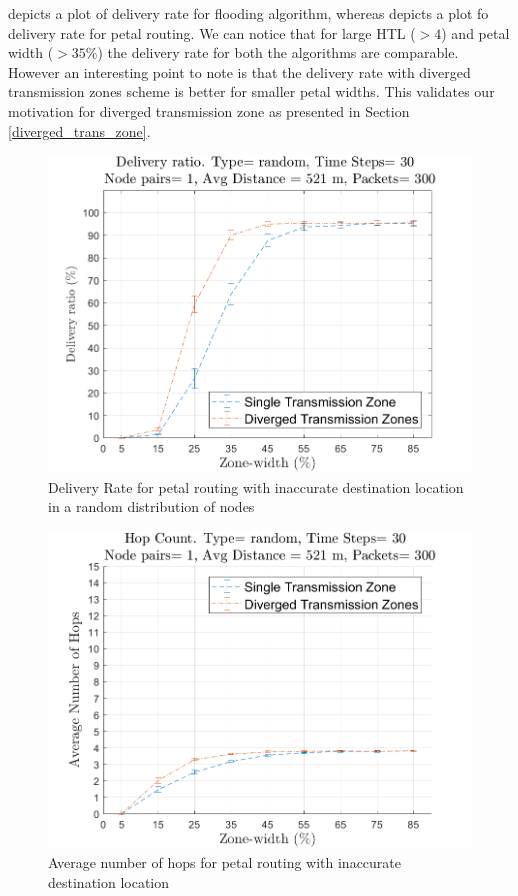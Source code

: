  depicts a plot of delivery rate for flooding algorithm, whereas  depicts a plot fo delivery rate for petal routing. We can notice that for large HTL ($> 4$) and petal width ($> 35\%$) the delivery rate for both the algorithms are comparable. However an interesting point to note is that the delivery rate with diverged transmission zones scheme is better for smaller petal widths. This validates our motivation for diverged transmission zone as presented in Section \ref{diverged_trans_zone}.

\begin{figure}[hbtp]
\centering
\includegraphics[width=\simResultFigSize\textwidth]{ncsuthesis-0.6/Chapter-5/figs/mob_pe_DR_random.png}
\caption{Delivery Rate for petal routing with inaccurate destination location in a random distribution of nodes}
\label{fig:mob_pe_DR_random}
\end{figure}

\begin{figure}[hbtp]
\centering
\includegraphics[width=\simResultFigSize\textwidth]{ncsuthesis-0.6/Chapter-5/figs/mob_pe_hops_random.png}
\caption{Average number of hops for petal routing with inaccurate destination location}
\label{fig:mob_pe_hops_random}
\end{figure}

